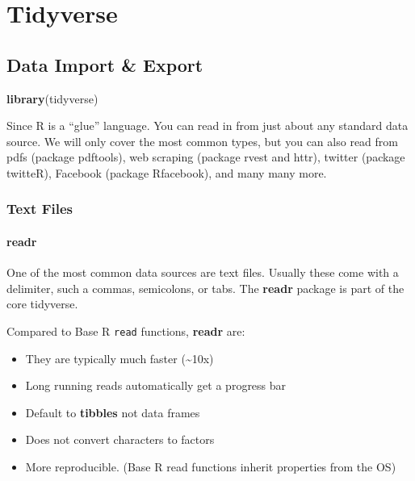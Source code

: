 \documentclass[]{book}
\newenvironment{Shaded}{\begin{snugshade}}{\end{snugshade}}
\newcommand{\KeywordTok}[1]{\textcolor[rgb]{0.13,0.29,0.53}{\textbf{#1}}}
\newcommand{\NormalTok}[1]{#1}
\providecommand{\tightlist}{%
  \setlength{\itemsep}{0pt}\setlength{\parskip}{0pt}}
\begin{document}
\part{Tidyverse}\label{part-tidyverse}

\chapter{Data Import \& Export}\label{data-import-export}

\begin{Shaded}
\begin{Highlighting}[]
\KeywordTok{library}\NormalTok{(tidyverse)}
\end{Highlighting}
\end{Shaded}

Since R is a ``glue'' language. You can read in from just about any
standard data source. We will only cover the most common types, but you
can also read from pdfs (package pdftools), web scraping (package rvest
and httr), twitter (package twitteR), Facebook (package Rfacebook), and
many many more.

\section{Text Files}\label{text-files}

\subsection{readr}\label{readr}

One of the most common data sources are text files. Usually these come
with a delimiter, such a commas, semicolons, or tabs. The \textbf{readr}
package is part of the core tidyverse.

Compared to Base R \texttt{read} functions, \textbf{readr} are:

\begin{itemize}
\tightlist
\item
  They are typically much faster (\textasciitilde{}10x)
\item
  Long running reads automatically get a progress bar
\item
  Default to \textbf{tibbles} not data frames
\item
  Does not convert characters to factors
\item
  More reproducible. (Base R read functions inherit properties from the
  OS)
\end{itemize}
\end{document}
